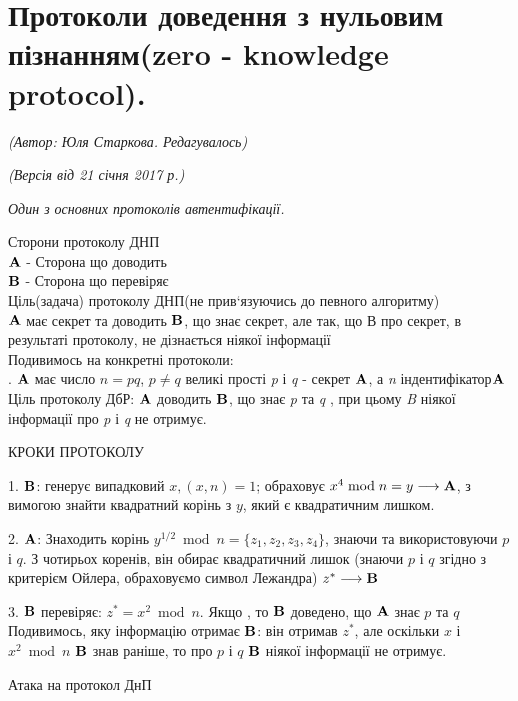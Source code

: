 %

\section{Протоколи доведення з нульовим пізнанням(zero - knowledge protocol).}
\begin{flushright}
\emph{(Автор: Юля Старкова. Редагувалось)}
\par \emph{(Версія від 21 січня 2017 р.)}
\end{flushright}


\begin{center}
\textit{Один з основних протоколів автентифікації.}\\
\end{center}
Сторони протоколу ДНП\\
$\bold{A}$ - Сторона що доводить\\
$\bold{B}$ - Сторона що перевіряє\\

Ціль(задача) протоколу ДНП(не прив`язуючись до певного алгоритму)\\

$\bold{A}$ має секрет та доводить $\bold{B}$, що знає секрет, але так, що В про секрет, в результаті протоколу, не дізнається ніякої інформації\\
Подивимось на конкретні протоколи:\\

. $\bold{A}$ має число $n = pq$,  $p\neq q$ великі прості \textsl{p} і \textsl{q} - секрет $\bold{A}$, а \textsl{n} \glqq індентифікатор\grqq $\bold{A}$\\
Ціль протоколу ДбР: $\bold{A}$ доводить $\bold{B}$, що знає \textsl{p} та \textsl{q} , при цьому \textsl{B} ніякої інформації про \textsl{p} і \textsl{q} не отримує.\\

\begin{center} 
КРОКИ ПРОТОКОЛУ
\end{center}

1. $\bold{B}$: генерує випадковий $x, (x,n) = 1$; 
обраховує $  x^4\bmod{n} = y \longrightarrow \bold{A}$, з вимогою знайти квадратний корінь з $y$, який є квадратичним лишком.
\par2. $\bold{A}$: Знаходить корінь $y^{1/2}\bmod n=\{z_1, z_2, z_3, z_4\} $, знаючи та використовуючи $p$ і $q$. З  чотирьох коренів, він обирає квадратичний лишок (знаючи $p$ і $q$ згідно з критерієм Ойлера, обраховуємо символ Лежандра) $z^* \longrightarrow \bold{B}$
\par3. $\bold{B}$  перевіряє: $z^* = x^2\bmod n$. Якщо \grqq, то $\bold{B}$ доведено, що $\bold{A}$ знає $p$ та $q$\\
Подивимось, яку інформацію отримає $\bold{B}$: він отримав $z^*$, але оскільки $x$ і $x^2\bmod n$ $\bold{B}$ знав раніше, то про $p$ і $q$ $\bold{B}$ ніякої інформації не отримує.\\
\begin{center}
Атака на протокол ДнП 
\end{center}

